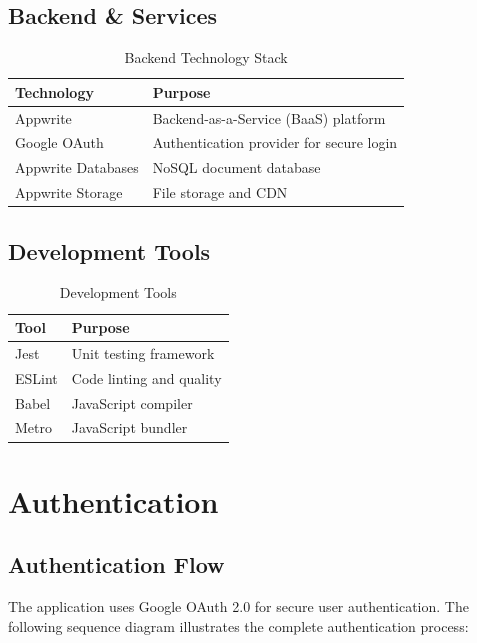\documentclass[11pt,a4paper,oneside]{book}
\begin{document}
\section{Backend \& Services}

\begin{table}[h]
\centering
\begin{tabularx}{\textwidth}{l X}
\toprule
\textbf{Technology} & \textbf{Purpose} \\
\midrule
Appwrite & Backend-as-a-Service (BaaS) platform \\
Google OAuth & Authentication provider for secure login \\
Appwrite Databases & NoSQL document database \\
Appwrite Storage & File storage and CDN \\
\bottomrule
\end{tabularx}
\caption{Backend Technology Stack}
\end{table}

\section{Development Tools}

\begin{table}[h]
\centering
\begin{tabularx}{\textwidth}{l X}
\toprule
\textbf{Tool} & \textbf{Purpose} \\
\midrule
Jest & Unit testing framework \\
ESLint & Code linting and quality \\
Babel & JavaScript compiler \\
Metro & JavaScript bundler \\
\bottomrule
\end{tabularx}
\caption{Development Tools}
\end{table}

\chapter{Authentication}

\section{Authentication Flow}

The application uses Google OAuth 2.0 for secure user authentication. The following sequence diagram illustrates the complete authentication process:
\end{document}

